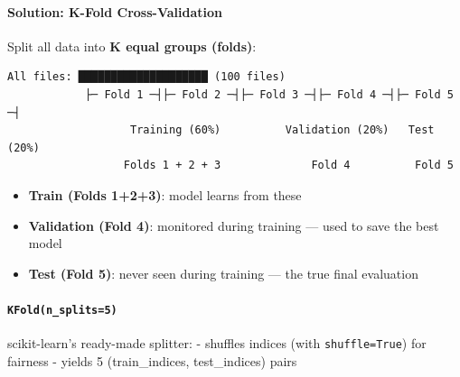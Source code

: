 \documentclass[11pt]{article}
\providecommand{\tightlist}{%
      \setlength{\itemsep}{0pt}\setlength{\parskip}{0pt}}
\begin{document}
\paragraph{Solution: K-Fold
Cross-Validation}\label{solution-k-fold-cross-validation}

Split all data into \textbf{K equal groups (folds)}:

\begin{verbatim}
All files: ████████████████████ (100 files)
            ├─ Fold 1 ─┤├─ Fold 2 ─┤├─ Fold 3 ─┤├─ Fold 4 ─┤├─ Fold 5 ─┤
                   Training (60%)          Validation (20%)   Test (20%)
                  Folds 1 + 2 + 3              Fold 4          Fold 5
\end{verbatim}

\begin{itemize}
\tightlist
\item
  \textbf{Train (Folds 1+2+3)}: model learns from these
\item
  \textbf{Validation (Fold 4)}: monitored during training --- used to
  save the best model
\item
  \textbf{Test (Fold 5)}: never seen during training --- the true final
  evaluation
\end{itemize}

\paragraph{\texorpdfstring{\texttt{KFold(n\_splits=5)}}{KFold(n\_splits=5)}}\label{kfoldn_splits5}

scikit-learn's ready-made splitter: - shuffles indices (with
\texttt{shuffle=True}) for fairness - yields 5 (train\_indices,
test\_indices) pairs
\end{document}
